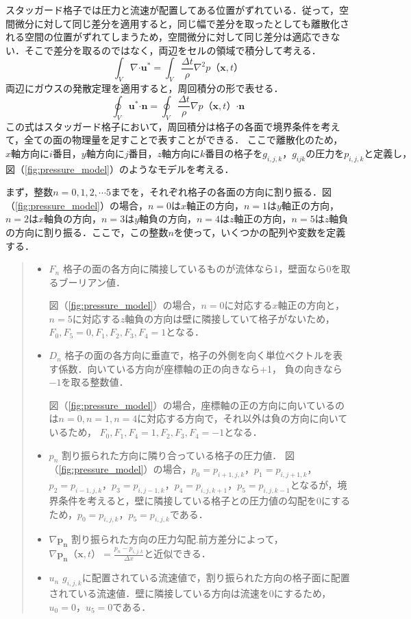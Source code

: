 \documentclass[a4j,12pt]{jreport}
\begin{document}
スタッガード格子では圧力と流速が配置してある位置がずれている．従って，空間微分に対して同じ差分を適用すると，同じ幅で差分を取ったとしても離散化される空間の位置がずれてしまうため，空間微分に対して同じ差分は適応できない．そこで差分を取るのではなく，両辺をセルの領域で積分して考える．
$$\int_V\nabla\boldsymbol{\cdot}\bm{u}^* = \int_V\frac{\varDelta t}{\rho}\nabla^2 p（\bm{x},t）$$
両辺にガウスの発散定理を適用すると，周回積分の形で表せる．
$$\oint_V\bm{u}^*\boldsymbol{\cdot}\bm{n} = \oint_V\frac{\varDelta t}{\rho}\nabla p（\bm{x},t）\boldsymbol{\cdot}\bm{n}$$
この式はスタッガード格子において，周回積分は格子の各面で境界条件を考えて，全ての面の物理量を足すことで表すことができる．
ここで離散化のため，$x軸方向にi番目，y軸方向にj番目，z軸方向にk番目の格子をg_{i,j,k}，g_{ijk}の圧力をp_{i,j,k}と定義し，$図（\ref{fig:pressure_model}）のようなモデルを考える．

まず，整数$n=0,1,2,\cdots 5$までを，それぞれ格子の各面の方向に割り振る．図（\ref{fig:pressure_model}）の場合，$n=0$は$x$軸正の方向，$n=1$は$y$軸正の方向，$n=2$は$x$軸負の方向，$n=3$は$y$軸負の方向，$n=4$は$z$軸正の方向，$n=5$は$z$軸負の方向に割り振る．ここで，この整数$n$を使って，いくつかの配列や変数を定義する．
\begin{quote}
	\begin{itemize}
		\item $F_n$ 格子の面の各方向に隣接しているものが流体なら$1$，壁面なら$0$を取るブーリアン値．
		
		図（\ref{fig:pressure_model}）の場合，$n=0$に対応する$x$軸正の方向と，$n=5$に対応する$z$軸負の方向は壁に隣接していて格子がないため，$F_0,F_5 = 0,F_1,F_2,F_3,F_4 = 1$となる．
		\item $D_n$ 格子の面の各方向に垂直で，格子の外側を向く単位ベクトルを表す係数．向いている方向が座標軸の正の向きなら+1，					負の向きなら$-1$を取る整数値．
		
		図（\ref{fig:pressure_model}）の場合，座標軸の正の方向に向いているのは$n=0,n=1,n=4$に対応する方向で，それ以外は負の方向に向いているため，
		$F_0,F_1,F_4 = 1,F_2,F_3,F_4 = -1$となる．
		\item $p_n$ 割り振られた方向に隣り合っている格子の圧力値．
		図（\ref{fig:pressure_model}）の場合，$p_0 = p_{i+1,j,k}$，$p_1 = p_{i,j+1,k}$，$p_2 = p_{i-1,j,k}$，$p_3 = p_{i,j-1,k}$，$p_4 = p_{i,j,k+1}$，$p_5 = p_{i,j,k-1}$となるが，境界条件を考えると，壁に隣接している格子との圧力値の勾配を$0$にするため，$p_0 = p_{i,j,k}$，$p_5 = p_{i,j,k}$である．
		\item $\nabla\bm{p_n}$ 割り振られた方向の圧力勾配.前方差分によって，$\nabla \bm{p_n}（\bm{x},t） = \frac{p_n - p_{i,j,k}}{\varDelta x}$と近似できる．
		\item $u_n$ $g_{i,j,k}$に配置されている流速値で，割り振られた方向の格子面に配置されている流速値．壁に隣接している方向は流速を$0$にするため，$u_0 = 0$，$u_5 = 0$である．
	\end{itemize}
\end{quote}
\end{document}
